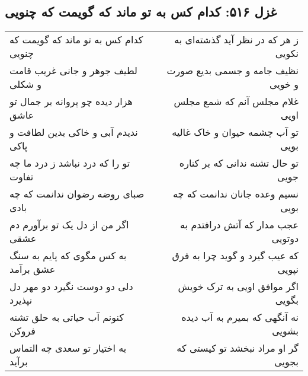 \begin{center}
\section*{غزل ۵۱۶: کدام کس به تو ماند که گویمت که چنویی}
\label{sec:516}
\begin{longtable}{l p{0.5cm} r}
کدام کس به تو ماند که گویمت که چنویی
&&
ز هر که در نظر آید گذشته‌ای به نکویی
\\
لطیف جوهر و جانی غریب قامت و شکلی
&&
نظیف جامه و جسمی بدیع صورت و خویی
\\
هزار دیده چو پروانه بر جمال تو عاشق
&&
غلام مجلس آنم که شمع مجلس اویی
\\
ندیدم آبی و خاکی بدین لطافت و پاکی
&&
تو آب چشمه حیوان و خاک غالیه بویی
\\
تو را که درد نباشد ز درد ما چه تفاوت
&&
تو حال تشنه ندانی که بر کناره جویی
\\
صبای روضه رضوان ندانمت که چه بادی
&&
نسیم وعده جانان ندانمت که چه بویی
\\
اگر من از دل یک تو برآورم دم عشقی
&&
عجب مدار که آتش درافتدم به دوتویی
\\
به کس مگوی که پایم به سنگ عشق برآمد
&&
که عیب گیرد و گوید چرا به فرق نپویی
\\
دلی دو دوست نگیرد دو مهر دل نپذیرد
&&
اگر موافق اویی به ترک خویش بگویی
\\
کنونم آب حیاتی به حلق تشنه فروکن
&&
نه آنگهی که بمیرم به آب دیده بشویی
\\
به اختیار تو سعدی چه التماس برآید
&&
گر او مراد نبخشد تو کیستی که بجویی
\\
\end{longtable}
\end{center}
